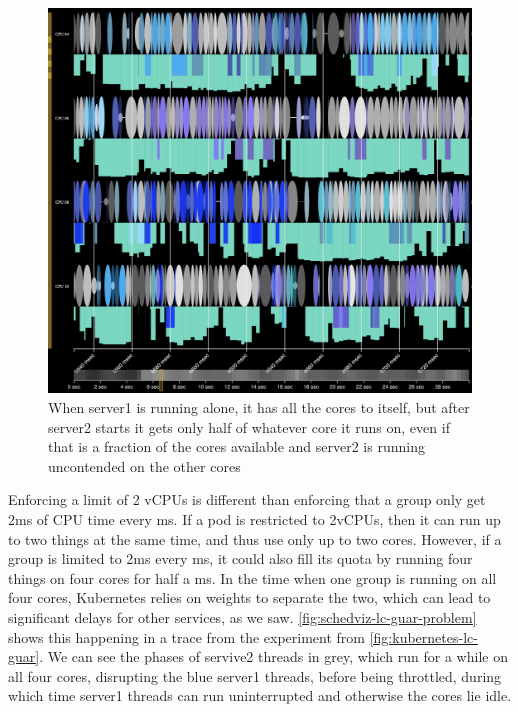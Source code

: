 \begin{figure}[t]
    \centering
    \includegraphics[width=\columnwidth]{graphs/schedviz-lc-guar-problem.png}
    \caption{When server1 is running alone, it has all the cores to itself, but
    after server2 starts it gets only half of whatever core it runs on, even if
    that is a fraction of the cores available and server2 is running uncontended
    on the other cores}\label{fig:schedviz-lc-guar-problem}
\end{figure}

Enforcing a limit of 2 vCPUs is different than enforcing that a group only get
2ms of CPU time every ms. If a pod is restricted to 2vCPUs, then it can run up
to two things at the same time, and thus use only up to two cores. However, if a
group is limited to 2ms every ms, it could also fill its quota by running four
things on four cores for half a ms. In the time when one group is running on all
four cores, Kubernetes relies on weights to separate the two, which can lead to
significant delays for other services, as we saw.
\autoref{fig:schedviz-lc-guar-problem} shows this happening in a trace from the
experiment from \autoref{fig:kubernetes-lc-guar}. We can see the phases of
servive2 threads in grey, which run for a while on all four cores, disrupting
the blue server1 threads, before being throttled, during which time server1
threads can run uninterrupted and otherwise the cores lie idle.



